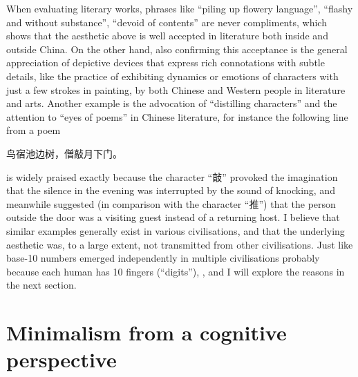 When evaluating literary works, phrases like ``piling up flowery language'',
``flashy and without substance'', ``devoid of contents'' \etc{} are never
compliments, which shows that the aesthetic above is well accepted in literature
both inside and outside China.  On the other hand, also confirming this
acceptance is the general appreciation of depictive devices that express rich
connotations with subtle details, like the practice of exhibiting dynamics or
emotions of characters with just a few strokes in painting, by both Chinese
and Western people in literature and arts.  Another example is the advocation
of ``distilling characters'' and the attention to ``eyes of poems'' in
Chinese literature, for instance the following line from a poem
\begin{quoting}
	鸟宿池边树，僧敲月下门。
\end{quoting}
is widely praised exactly because the character ``敲'' provoked the
imagination that the silence in the evening was interrupted by the sound
of knocking, and meanwhile suggested (in comparison with the character
``推'') that the person outside the door was a visiting guest instead of a
returning host.  I believe that similar examples generally exist in various
civilisations, and that the underlying aesthetic was, to a large extent,
not transmitted from other civilisations.  Just like base-10 numbers emerged
independently in multiple civilisations probably because each human has 10
fingers (``digits''), ,
and I will explore the reasons in the next section.

\section{Minimalism from a cognitive perspective}\label{sec:cognitive}


